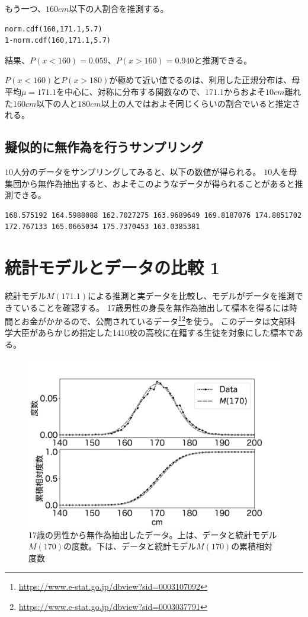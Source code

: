 もう一つ、$160cm$以下の人割合を推測する。

\begin{lstlisting}
norm.cdf(160,171.1,5.7)
1-norm.cdf(160,171.1,5.7)
\end{lstlisting}
結果、$P(x<160)=0.059$、$P(x>160)=0.940$と推測できる。

$P(x<160)$と$P(x>180)$が極めて近い値でるのは、利用した正規分布は、母平均$\mu=171.1$を中心に、対称に分布する関数なので、$171.1$からおよそ$10cm$離れた$160cm$以下の人と$180cm$以上の人ではおよそ同じくらいの割合でいると推定される。
    
\subsection{擬似的に無作為を行うサンプリング}
$10$人分のデータをサンプリングしてみると、以下の数値が得られる。
$10$人を母集団から無作為抽出すると、およそこのようなデータが得られることがあると推測できる。

\begin{lstlisting}
168.575192 164.5988088 162.7027275 163.9689649 169.8187076 174.8851702 172.767133 165.0665034 175.7370453 163.0385381
\end{lstlisting}



\section{統計モデルとデータの比較 1}
統計モデル$M(171.1)$による推測と実データを比較し、モデルがデータを推測できていることを確認する。
17歳男性の身長を無作為抽出して標本を得るには時間とお金がかかるので、公開されているデータ\footnote{ \url{https://www.e-stat.go.jp/dbview?sid=0003107092} }\footnote{\url{https://www.e-stat.go.jp/dbview?sid=0003037791}}を使う。
このデータは文部科学大臣があらかじめ指定した1410校の高校に在籍する生徒を対象にした標本である。

\begin{figure}
\begin{center}
    \includegraphics[width=15cm]{./image/03_/cm_data.pdf}
    \caption{17歳の男性から無作為抽出したデータ。上は、データと統計モデル$M(170)$の度数。下は、データと統計モデル$M(170)$の累積相対度数}
    \label{fig:real_height_men}
\end{center}
\end{figure}


